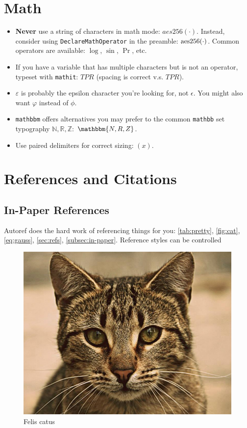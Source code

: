 \section{Math}
\begin{itemize}
  \item \textbf{Never} use a string of characters in math mode: $aes256(\cdot)$.
    Instead, consider using \texttt{DeclareMathOperator} in the preamble:
    $\operatorname{aes256}(\cdot)$. Common operators are available: $\log$, $\sin$, $\Pr$, etc.
  \item If you have a variable that has multiple characters but is not an
    operator, typeset with \texttt{mathit}: $\mathit{TPR}$ (spacing is correct
    v.s. $TPR$).
  \item $\varepsilon$ is probably the epsilon character you're looking for, not
    $\epsilon$. You might also want $\varphi$ instead of $\phi$.
  \item \texttt{mathbbm} offers alternatives you may prefer to the common
    \texttt{mathbb} set typography 
    $\mathbb{N, R, Z}$: $\mathbbm{N, R, Z}$.
  \item Use paired delimiters for correct sizing: $\left( x \right)$.
\end{itemize}

\section{References and Citations}
\label{sec:refs}

\subsection{In-Paper References}
\label{subsec:in-paper}

Autoref does the hard work of referencing things for you:
\autoref{tab:pretty}, \autoref{fig:cat}, \autoref{eq:gauss}, \autoref{sec:refs},
\autoref{subsec:in-paper}. Reference styles can be controlled 

\begin{figure}[t]
  \centering
  \includegraphics[width=\columnwidth]{cat.png}
  \caption{Felis catus}
  \label{fig:cat}
\end{figure}

